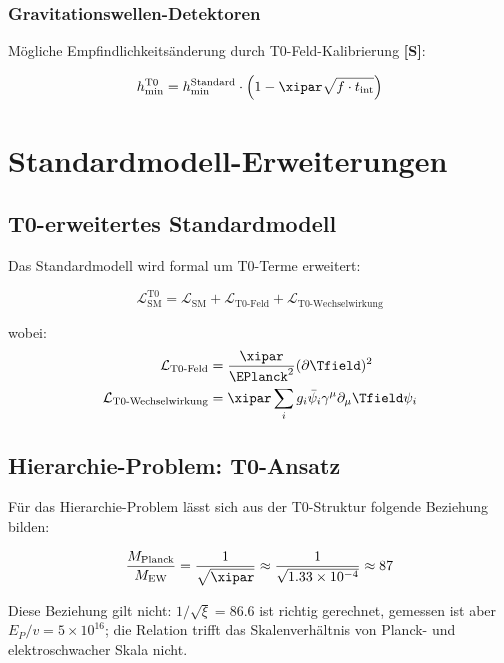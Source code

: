 	\subsubsection{Gravitationswellen-Detektoren}
	
	Mögliche Empfindlichkeitsänderung durch T0-Feld-Kalibrierung \textbf{[S]}:
	
	\begin{equation}
		h_{\text{min}}^{\text{T0}} = h_{\text{min}}^{\text{Standard}} \cdot \left(1 - \xipar \sqrt{f \cdot t_{\text{int}}}\right)
	\end{equation}
	
	\section{Standardmodell-Erweiterungen}
	
	\subsection{T0-erweitertes Standardmodell}
	
	Das Standardmodell wird formal um T0-Terme erweitert:
	
	\begin{equation}
		\mathcal{L}_{\text{SM}}^{\text{T0}} = \mathcal{L}_{\text{SM}} + \mathcal{L}_{\text{T0-Feld}} + \mathcal{L}_{\text{T0-Wechselwirkung}}
	\end{equation}
	
	wobei:
	\begin{align}
		\mathcal{L}_{\text{T0-Feld}} &= \frac{\xipar}{\EPlanck^2} (\partial \Tfield)^2 \\
		\mathcal{L}_{\text{T0-Wechselwirkung}} &= \xipar \sum_i g_i \bar{\psi}_i \gamma^\mu \partial_\mu \Tfield \psi_i
	\end{align}
	
	\subsection{Hierarchie-Problem: T0-Ansatz}
	
	Für das Hierarchie-Problem lässt sich aus der T0-Struktur folgende Beziehung bilden:
	
	\begin{equation}
		\frac{M_{\text{Planck}}}{M_{\text{EW}}} = \frac{1}{\sqrt{\xipar}} \approx \frac{1}{\sqrt{1.33 \times 10^{-4}}} \approx 87
	\end{equation}
	
	Diese Beziehung gilt nicht: $1/\sqrt{\xi} = 86.6$ ist richtig gerechnet, gemessen ist aber $E_P/v = 5 \times 10^{16}$; die Relation trifft das Skalenverhältnis von Planck- und elektroschwacher Skala nicht.

